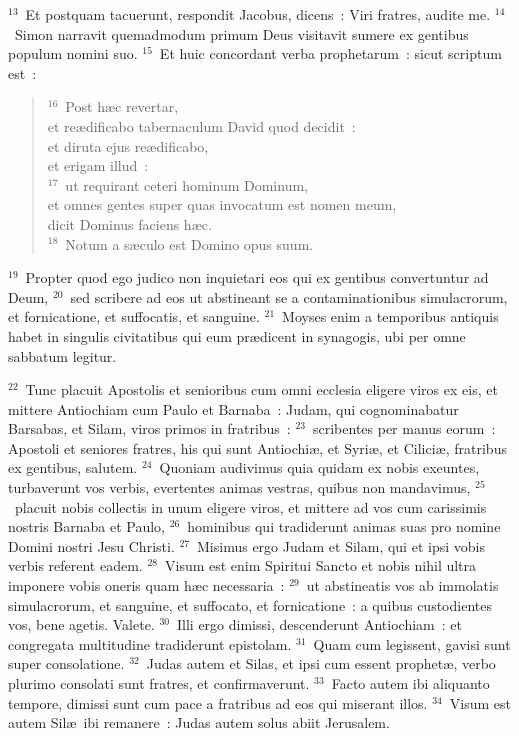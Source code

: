 ${}^{13}$~Et postquam tacuerunt, respondit Jacobus, dicens~: Viri fratres, audite me.
${}^{14}$~Simon narravit quemadmodum primum Deus visitavit sumere ex gentibus populum nomini suo.
${}^{15}$~Et huic concordant verba prophetarum~: sicut scriptum est~:
\begin{flushleft}\begin{verse}${}^{16}$~Post h\ae c revertar,\\ et re\ae dificabo tabernaculum David quod decidit~:\\ et diruta ejus re\ae dificabo,\\ et erigam illud~:\\
${}^{17}$~ut requirant ceteri hominum Dominum,\\ et omnes gentes super quas invocatum est nomen meum,\\ dicit Dominus faciens h\ae c.\\
${}^{18}$~Notum a s\ae culo est Domino opus suum.\end{verse}\end{flushleft}


${}^{19}$~Propter quod ego judico non inquietari eos qui ex gentibus convertuntur ad Deum,
${}^{20}$~sed scribere ad eos ut abstineant se a contaminationibus simulacrorum, et fornicatione, et suffocatis, et sanguine.
${}^{21}$~Moyses enim a temporibus antiquis habet in singulis civitatibus qui eum pr\ae dicent in synagogis, ubi per omne sabbatum legitur.


${}^{22}$~Tunc placuit Apostolis et senioribus cum omni ecclesia eligere viros ex eis, et mittere Antiochiam cum Paulo et Barnaba~: Judam, qui cognominabatur Barsabas, et Silam, viros primos in fratribus~:
${}^{23}$~scribentes per manus eorum~: Apostoli et seniores fratres, his qui sunt Antiochi\ae , et Syri\ae , et Cilici\ae , fratribus ex gentibus, salutem.
${}^{24}$~Quoniam audivimus quia quidam ex nobis exeuntes, turbaverunt vos verbis, evertentes animas vestras, quibus non mandavimus,
${}^{25}$~placuit nobis collectis in unum eligere viros, et mittere ad vos cum carissimis nostris Barnaba et Paulo,
${}^{26}$~hominibus qui tradiderunt animas suas pro nomine Domini nostri Jesu Christi.
${}^{27}$~Misimus ergo Judam et Silam, qui et ipsi vobis verbis referent eadem.
${}^{28}$~Visum est enim Spiritui Sancto et nobis nihil ultra imponere vobis oneris quam h\ae c necessaria~:
${}^{29}$~ut abstineatis vos ab immolatis simulacrorum, et sanguine, et suffocato, et fornicatione~: a quibus custodientes vos, bene agetis. Valete.
${}^{30}$~Illi ergo dimissi, descenderunt Antiochiam~: et congregata multitudine tradiderunt epistolam.
${}^{31}$~Quam cum legissent, gavisi sunt super consolatione.
${}^{32}$~Judas autem et Silas, et ipsi cum essent prophet\ae , verbo plurimo consolati sunt fratres, et confirmaverunt.
${}^{33}$~Facto autem ibi aliquanto tempore, dimissi sunt cum pace a fratribus ad eos qui miserant illos.
${}^{34}$~Visum est autem Sil\ae\ ibi remanere~: Judas autem solus abiit Jerusalem.


